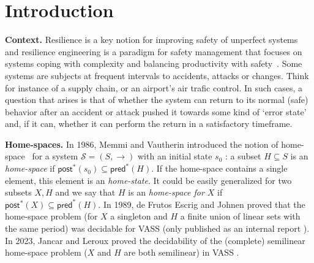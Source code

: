 \documentclass[runningheads]{llncs}
\newcommand{\alain}[1]{\todo[inline,color=red!20]{{\bf AF:} #1}}
\newcommand{\pred}{\textsf{pred}}
\newcommand{\post}{\textsf{post}}
\begin{document}



\newcommand{\LCM}{\mathsf{LCM}}
\newcommand{\LOGSPACE}{\mathsf{LOGSPACE}}
\newcommand{\MSO}{\mathsf{MSO}}
\newcommand{\SO}{\mathsf{SO}}

 \newcommand{\N}{\mathds{N}}



\section{Introduction}\label{section introduction}


{\bf Context.} 
Resilience is a key notion for improving safety of unperfect systems and resilience engineering is a paradigm for safety management that focuses on systems coping with complexity and balancing productivity with safety~\cite{challenges}. Some systems are subjects at frequent intervals to accidents, attacks or changes. Think for instance of a supply chain, or an airport’s air trafic control. In such cases, a question that arises is that of whether the system can return to its normal (safe) behavior after an accident or attack
pushed it towards some kind of ‘error state’ and, if it can, whether it can perform the return in a satisfactory timeframe. 


{\bf Home-spaces.}
 In 1986, Memmi and Vautherin introduced the notion of home-space~\cite{DBLP:conf/ac/MemmiV86} for a system $\mathscr{S} = (S,\rightarrow )$ with an initial state $s_0$ : a subset $H \subseteq S$ is an \emph{home-space}  if 
$\post^*(s_0) \subseteq \pred^*(H)$. If the home-space contains a single element, this element is an {\em home-state}.
It could be easily generalized for two subsets $X,H$ and we say that $H$ is an \emph{home-space for $X$} if $\post^*(X) \subseteq \pred^*(H)$. In 1989, de Frutos Escrig and Johnen proved that the home-space problem (for $X$ a singleton and $H$ a finite union of linear sets with the same period) was decidable for VASS (only published as an internal report \cite{de1989decidability}). In 2023, Jancar and Leroux proved the decidability of the (complete) semilinear home-space problem ($X$ and $H$ are both semilinear)  in VASS \cite{DBLP:journals/corr/abs-2207-02697}.
\end{document}
